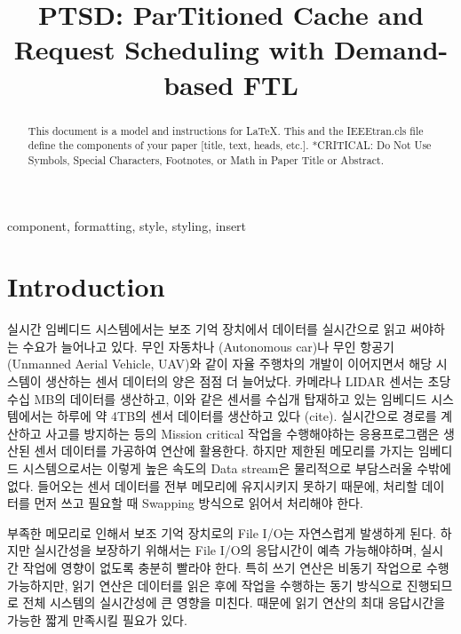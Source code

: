 \documentclass[conference]{IEEEtran}
\begin{document}
\title{PTSD: \textbf{P}ar\textbf{T}itioned Cache and Request \textbf{S}cheduling with \textbf{D}emand-based FTL}

\author{
\and
{}
}

\maketitle

\begin{abstract}
This document is a model and instructions for \LaTeX.
This and the IEEEtran.cls file define the components of your paper [title, text, heads, etc.]. *CRITICAL: Do Not Use Symbols, Special Characters, Footnotes, 
or Math in Paper Title or Abstract.
\end{abstract}

\begin{IEEEkeywords}
component, formatting, style, styling, insert
\end{IEEEkeywords}

\section{Introduction}

실시간 임베디드 시스템에서는 보조 기억 장치에서 데이터를 실시간으로 읽고 써야하는 수요가 늘어나고 있다.
무인 자동차나 (Autonomous car)나 무인 항공기 (Unmanned Aerial Vehicle, UAV)와 같이 자율 주행차의 개발이 이어지면서
해당 시스템이 생산하는 센서 데이터의 양은 점점 더 늘어났다. 카메라나 LIDAR 센서는 초당 수십 MB의 데이터를 생산하고,
이와 같은 센서를 수십개 탑재하고 있는 임베디드 시스템에서는 하루에 약 4TB의 센서 데이터를 생산하고 있다 (cite).
실시간으로 경로를 계산하고 사고를 방지하는 등의 Mission critical 작업을 수행해야하는 응용프로그램은
생산된 센서 데이터를 가공하여 연산에 활용한다. 하지만 제한된 메모리를 가지는 임베디드 시스템으로서는 이렇게 높은 속도의
Data stream은 물리적으로 부담스러울 수밖에 없다. 들어오는 센서 데이터를 전부 메모리에 유지시키지 못하기 때문에,
처리할 데이터를 먼저 쓰고 필요할 때 Swapping 방식으로 읽어서 처리해야 한다. \par

부족한 메모리로 인해서 보조 기억 장치로의 File I/O는 자연스럽게 발생하게 된다. 하지만 실시간성을 보장하기 위해서는
File I/O의 응답시간이 예측 가능해야하며, 실시간 작업에 영향이 없도록 충분히 빨라야 한다. 특히 쓰기 연산은
비동기 작업으로 수행 가능하지만, 읽기 연산은 데이터를 읽은 후에 작업을 수행하는 동기 방식으로 진행되므로
전체 시스템의 실시간성에 큰 영향을 미친다. 때문에 읽기 연산의 최대 응답시간을 가능한 짧게 만족시킬 필요가 있다. \par
\end{document}
